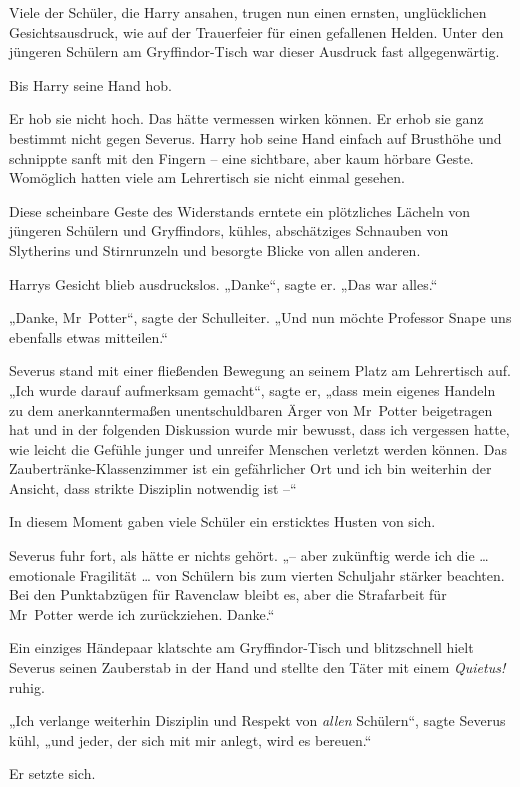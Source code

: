 {Viele der Schüler, die Harry ansahen, trugen nun einen ernsten, unglücklichen Gesichtsausdruck, wie auf der Trauerfeier für einen gefallenen Helden. Unter den jüngeren Schülern am Gryffindor-Tisch war dieser Ausdruck fast allgegenwärtig.

Bis Harry seine Hand hob.

Er hob sie nicht hoch. Das hätte vermessen wirken können. Er erhob sie ganz bestimmt nicht gegen Severus. Harry hob seine Hand einfach auf Brusthöhe und schnippte sanft mit den Fingern -- eine sichtbare, aber kaum hörbare Geste. Womöglich hatten viele am Lehrertisch sie nicht einmal gesehen.

Diese scheinbare Geste des Widerstands erntete ein plötzliches Lächeln von jüngeren Schülern und Gryffindors, kühles, abschätziges Schnauben von Slytherins und Stirnrunzeln und besorgte Blicke von allen anderen.

Harrys Gesicht blieb ausdruckslos. „Danke“, sagte er. „Das war alles.“

„Danke, Mr~Potter“, sagte der Schulleiter. „Und nun möchte Professor Snape uns ebenfalls etwas mitteilen.“

Severus stand mit einer fließenden Bewegung an seinem Platz am Lehrertisch auf. „Ich wurde darauf aufmerksam gemacht“, sagte er, „dass mein eigenes Handeln zu dem anerkanntermaßen unentschuldbaren Ärger von Mr~Potter beigetragen hat und in der folgenden Diskussion wurde mir bewusst, dass ich vergessen hatte, wie leicht die Gefühle junger und unreifer Menschen verletzt werden können. Das Zaubertränke-Klassenzimmer ist ein gefährlicher Ort und ich bin weiterhin der Ansicht, dass strikte Disziplin notwendig ist --“

In diesem Moment gaben viele Schüler ein ersticktes Husten von sich.

Severus fuhr fort, als hätte er nichts gehört. „-- aber zukünftig werde ich die … emotionale Fragilität … von Schülern bis zum vierten Schuljahr stärker beachten. Bei den Punktabzügen für Ravenclaw bleibt es, aber die Strafarbeit für Mr~Potter werde ich zurückziehen. Danke.“

Ein einziges Händepaar klatschte am Gryffindor-Tisch und blitzschnell hielt Severus seinen Zauberstab in der Hand und stellte den Täter mit einem \emph{Quietus!} ruhig.

„Ich verlange weiterhin Disziplin und Respekt von \emph{allen} Schülern“, sagte Severus kühl, „und jeder, der sich mit mir anlegt, wird es bereuen.“

Er setzte sich.

}
